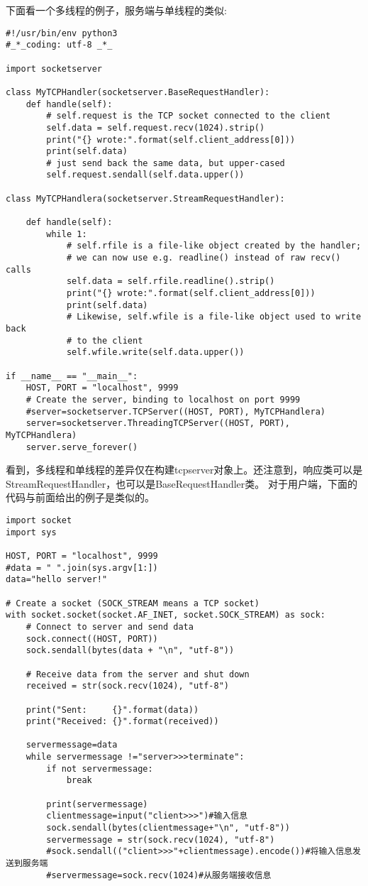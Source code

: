 \documentclass[twoside,11pt]{book}
\begin{document}
下面看一个多线程的例子，服务端与单线程的类似:
\begin{lstlisting}
#!/usr/bin/env python3
#_*_coding: utf-8 _*_

import socketserver

class MyTCPHandler(socketserver.BaseRequestHandler):
    def handle(self):
        # self.request is the TCP socket connected to the client
        self.data = self.request.recv(1024).strip()
        print("{} wrote:".format(self.client_address[0]))
        print(self.data)
        # just send back the same data, but upper-cased
        self.request.sendall(self.data.upper())

class MyTCPHandlera(socketserver.StreamRequestHandler):

    def handle(self):
        while 1:
            # self.rfile is a file-like object created by the handler;
            # we can now use e.g. readline() instead of raw recv() calls
            self.data = self.rfile.readline().strip()
            print("{} wrote:".format(self.client_address[0]))
            print(self.data)
            # Likewise, self.wfile is a file-like object used to write back
            # to the client
            self.wfile.write(self.data.upper())

if __name__ == "__main__":
    HOST, PORT = "localhost", 9999
    # Create the server, binding to localhost on port 9999
    #server=socketserver.TCPServer((HOST, PORT), MyTCPHandlera)
    server=socketserver.ThreadingTCPServer((HOST, PORT), MyTCPHandlera)
    server.serve_forever()
\end{lstlisting}
看到，多线程和单线程的差异仅在构建tcpserver对象上。还注意到，响应类可以是StreamRequestHandler，也可以是BaseRequestHandler类。
对于用户端，下面的代码与前面给出的例子是类似的。
\begin{lstlisting}
import socket
import sys

HOST, PORT = "localhost", 9999
#data = " ".join(sys.argv[1:])
data="hello server!"

# Create a socket (SOCK_STREAM means a TCP socket)
with socket.socket(socket.AF_INET, socket.SOCK_STREAM) as sock:
    # Connect to server and send data
    sock.connect((HOST, PORT))
    sock.sendall(bytes(data + "\n", "utf-8"))

    # Receive data from the server and shut down
    received = str(sock.recv(1024), "utf-8")

    print("Sent:     {}".format(data))
    print("Received: {}".format(received))

    servermessage=data
    while servermessage !="server>>>terminate":
        if not servermessage:
            break

        print(servermessage)
        clientmessage=input("client>>>")#输入信息
        sock.sendall(bytes(clientmessage+"\n", "utf-8"))
        servermessage = str(sock.recv(1024), "utf-8")
        #sock.sendall(("client>>>"+clientmessage).encode())#将输入信息发送到服务端
        #servermessage=sock.recv(1024)#从服务端接收信息
\end{lstlisting}
\end{document}
